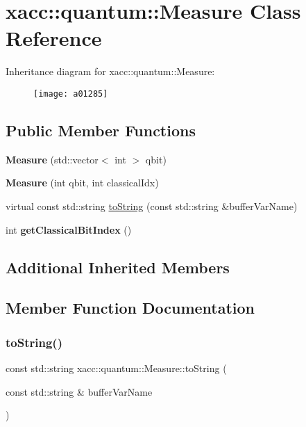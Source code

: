 \hypertarget{a01285}{}\section{xacc\+:\+:quantum\+:\+:Measure Class Reference}
\label{a01285}
Inheritance diagram for xacc\+:\+:quantum\+:\+:Measure\+:\begin{figure}[H]
\begin{center}
\leavevmode
\texttt{[image: a01285]}
\end{center}
\end{figure}
\subsection*{Public Member Functions}
\begin{DoxyCompactItemize}
\item 
\mbox{\label{a01285_afe330a0eea029d842ff9c88a817dcc7d}} 
{\bfseries Measure} (std\+::vector$<$ int $>$ qbit)
\item 
\mbox{\label{a01285_a9b8d9edca8ad2c3fb132780200f17335}} 
{\bfseries Measure} (int qbit, int classical\+Idx)
\item 
virtual const std\+::string \hyperlink{a01285_a1c51a5d68294dcb2ba1a9fbea63a730f}{to\+String} (const std\+::string \&buffer\+Var\+Name)
\item 
\mbox{\label{a01285_a0cb3c94731544042807236ade36fddd0}} 
int {\bfseries get\+Classical\+Bit\+Index} ()
\end{DoxyCompactItemize}
\subsection*{Additional Inherited Members}


\subsection{Member Function Documentation}
\mbox{\label{a01285_a1c51a5d68294dcb2ba1a9fbea63a730f}} 
\subsubsection{\texorpdfstring{to\+String()}{toString()}}
{\footnotesize\ttfamily const std\+::string xacc\+::quantum\+::\+Measure\+::to\+String (\begin{DoxyParamCaption}\item[{const std\+::string \&}]{buffer\+Var\+Name }\end{DoxyParamCaption})\hspace{0.3cm}{\ttfamily [virtual]}}

